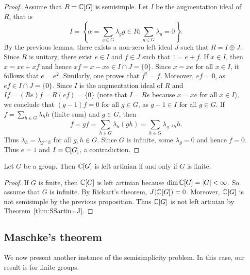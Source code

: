 \begin{proof}
	Assume that $R=\mathbb{C}[G]$ is semisimple.  Let $I$ 
	be the augmentation ideal of $R$, that is
	\[
	I=\left\{\alpha=\sum_{g\in G}\lambda_gg\in R:\sum_{g\in G}\lambda_g=0\right\}.
	\]
	By the previous lemma, 
	there exists a non-zero left ideal $J$ such that 
	$R=I\oplus J$. Since $R$ is unitary, there exist $e\in I$ and $f\in J$ such that
	$1=e+f$. If
	$x\in I$, then $x=xe+xf$ and hence $xf=x-xe\in I\cap J=\{0\}$. Since 
	$x=xe$ for all $x\in I$, it follows that $e=e^2$. Similarly, one proves
	that $f^2=f$. Moreover, $ef=0$, as $ef\in I\cap J=\{0\}$.  Since $I$ 
	is the augmentation ideal of $R$ and $If=(Re)f=R(ef)=\{0\}$ 
 (note that $I=Re$ because $x=xe$ for all $x\in I$), we conclude that
	$(g-1)f=0$
	for all $g\in G$, as $g-1\in I$ for all $g\in G$. If $f=\sum_{h\in
	G}\lambda_hh$ (finite sum) and $g\in G$, then  
	\[
	f=gf=\sum_{h\in G}\lambda_h(gh)=\sum_{h\in
	G}\lambda_{g^{-1}h}h.
	\]
        Thus $\lambda_h=\lambda_{g^{-1}h}$ for all $g,h\in G$. Since $G$ 
	is infinite, some $\lambda_g=0$ and hence $f=0$. Thus $e=1$ and $I=\mathbb{C}[G]$, a contradiction. 
\end{proof}


\begin{theorem}
	Let $G$ be a group. Then $\mathbb{C}[G]$ 
	is left artinian if and only if 
	$G$ is finite. 
\end{theorem}

\begin{proof}
    If $G$ is finite, then $\mathbb{C}[G]$ is left artinian because $\dim\mathbb{C}[G]=|G|<\infty$. So assume that 
    $G$ is infinite. By Rickart's theorem,   
	$J(\mathbb{C}[G])=0$. Moreover, $\mathbb{C}[G]$
	is not semisimple by the previous proposition. Thus
	$\mathbb{C}[G]$ is not left artinian by Theorem~\ref{thm:SSartin=J}.
\end{proof}




\subsection{Maschke's theorem}

We now present another instance of the semisimplicity problem.
In this case, our result is for finite groups. 

